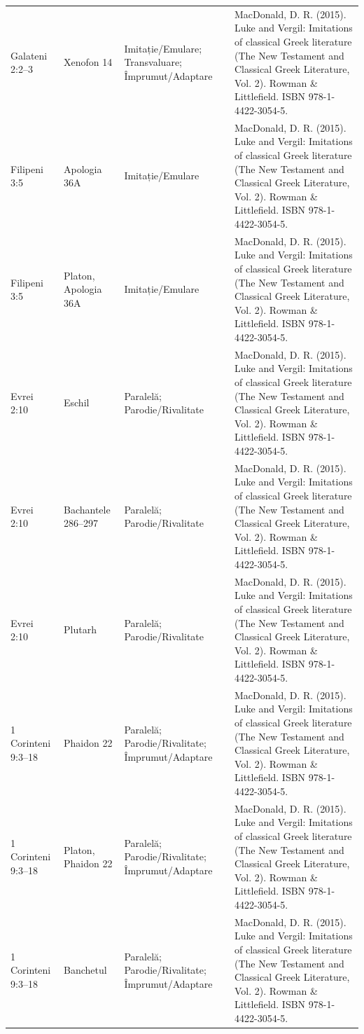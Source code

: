 \documentclass[12pt,a4paper,twoside,openany]{book}
\begin{document}
\begin{longtable}{L{1.4cm}L{1.7cm}L{3.1cm}L{8.4cm}}
Galateni 2:2–3 & Xenofon 14 & Imitație/Emulare; Transvaluare; Împrumut/Adaptare & MacDonald, D. R. (2015). Luke and Vergil: Imitations of classical Greek literature (The New Testament and Classical Greek Literature, Vol. 2). Rowman \& Littlefield. ISBN 978-1-4422-3054-5. \\
Filipeni 3:5 & Apologia 36A & Imitație/Emulare & MacDonald, D. R. (2015). Luke and Vergil: Imitations of classical Greek literature (The New Testament and Classical Greek Literature, Vol. 2). Rowman \& Littlefield. ISBN 978-1-4422-3054-5. \\
Filipeni 3:5 & Platon, Apologia 36A & Imitație/Emulare & MacDonald, D. R. (2015). Luke and Vergil: Imitations of classical Greek literature (The New Testament and Classical Greek Literature, Vol. 2). Rowman \& Littlefield. ISBN 978-1-4422-3054-5. \\
Evrei 2:10 & Eschil & Paralelă; Parodie/Rivalitate & MacDonald, D. R. (2015). Luke and Vergil: Imitations of classical Greek literature (The New Testament and Classical Greek Literature, Vol. 2). Rowman \& Littlefield. ISBN 978-1-4422-3054-5. \\
Evrei 2:10 & Bachantele 286–297 & Paralelă; Parodie/Rivalitate & MacDonald, D. R. (2015). Luke and Vergil: Imitations of classical Greek literature (The New Testament and Classical Greek Literature, Vol. 2). Rowman \& Littlefield. ISBN 978-1-4422-3054-5. \\
Evrei 2:10 & Plutarh & Paralelă; Parodie/Rivalitate & MacDonald, D. R. (2015). Luke and Vergil: Imitations of classical Greek literature (The New Testament and Classical Greek Literature, Vol. 2). Rowman \& Littlefield. ISBN 978-1-4422-3054-5. \\
1 Corinteni 9:3–18 & Phaidon 22 & Paralelă; Parodie/Rivalitate; Împrumut/Adaptare & MacDonald, D. R. (2015). Luke and Vergil: Imitations of classical Greek literature (The New Testament and Classical Greek Literature, Vol. 2). Rowman \& Littlefield. ISBN 978-1-4422-3054-5. \\
1 Corinteni 9:3–18 & Platon, Phaidon 22 & Paralelă; Parodie/Rivalitate; Împrumut/Adaptare & MacDonald, D. R. (2015). Luke and Vergil: Imitations of classical Greek literature (The New Testament and Classical Greek Literature, Vol. 2). Rowman \& Littlefield. ISBN 978-1-4422-3054-5. \\
1 Corinteni 9:3–18 & Banchetul & Paralelă; Parodie/Rivalitate; Împrumut/Adaptare & MacDonald, D. R. (2015). Luke and Vergil: Imitations of classical Greek literature (The New Testament and Classical Greek Literature, Vol. 2). Rowman \& Littlefield. ISBN 978-1-4422-3054-5. \\

\end{longtable}
\end{document}

